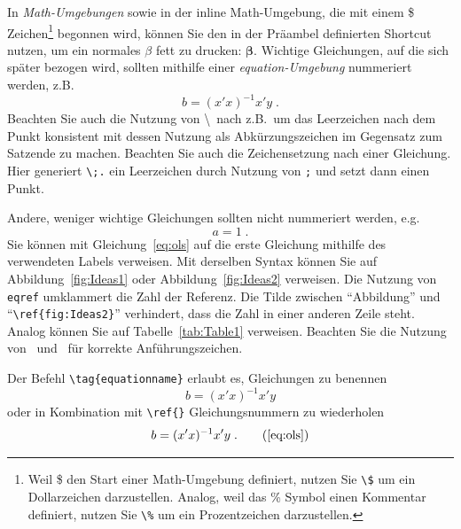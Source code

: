 \documentclass[a4paper,12pt]{scrartcl} %
\newcommand{\bs}{\boldsymbol}  %
\begin{document}
In \emph{Math-Umgebungen} sowie in der inline Math-Umgebung, die mit einem \$ Zeichen\footnote{Weil \$ den Start einer Math-Umgebung definiert, nutzen Sie \texttt{\textbackslash\$} um ein Dollarzeichen darzustellen. Analog, weil das \% Symbol einen Kommentar definiert, nutzen Sie \texttt{\textbackslash\%} um ein Prozentzeichen darzustellen.} begonnen wird, können Sie den in der Präambel definierten Shortcut nutzen, um ein normales $\beta$ fett zu drucken: $\bs \beta$. Wichtige Gleichungen, auf die sich später bezogen wird, sollten mithilfe einer \emph{equation-Umgebung} nummeriert werden, z.B.\
\begin{equation}\label{eq:ols}
	b = (x'x)^{-1}x'y \;.
\end{equation}
Beachten Sie auch die Nutzung von \textbackslash\ nach z.B.\ um das Leerzeichen nach dem Punkt konsistent mit dessen Nutzung als Abkürzungszeichen im Gegensatz zum Satzende zu machen. Beachten Sie auch die Zeichensetzung nach einer Gleichung. Hier generiert \verb|\;.| ein Leerzeichen durch Nutzung von \verb|;| und setzt dann einen Punkt.

Andere, weniger wichtige Gleichungen sollten nicht nummeriert werden, e.g.\
\begin{equation*}
	a = 1\;.
\end{equation*}
Sie können mit Gleichung~\eqref{eq:ols} auf die erste Gleichung mithilfe des verwendeten Labels verweisen. Mit derselben Syntax können Sie auf Abbildung~\ref{fig:Ideas1} oder Abbildung~\ref{fig:Ideas2} verweisen. Die Nutzung von \texttt{eqref} umklammert die Zahl der Referenz. Die Tilde zwischen ``Abbildung'' und ``\verb|\ref{fig:Ideas2}|'' verhindert, dass die Zahl in einer anderen Zeile steht. Analog können Sie auf Tabelle~\ref{tab:Table1} verweisen. Beachten Sie die Nutzung von \textasciigrave\textasciigrave\ und \textquotesingle\textquotesingle\ für korrekte Anführungszeichen.

Der Befehl \verb|\tag{equationname}| erlaubt es, Gleichungen zu benennen
\begin{equation}
	b = (x'x)^{-1}x'y \tag{OLS Estimator}
\end{equation}
oder in Kombination mit \verb|\ref{}| Gleichungsnummern zu wiederholen
\begin{equation}
	b = (x'x)^{-1}x'y \;. \tag{\ref{eq:ols}}
\end{equation}
\end{document}
